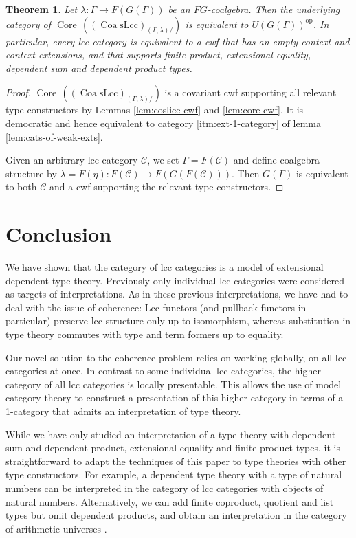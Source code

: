 \documentclass[a4paper]{article}
\newtheorem{theorem}{Theorem}
\theoremstyle{remark}
\theoremstyle{definition}
\begin{document}
\begin{theorem}
  \label{th:context-as-model}
  Let $\lambda : \Gamma \rightarrow F(G(\Gamma))$ be an $FG$-coalgebra.
  Then the underlying category of $\operatorname{Core} \, ((\operatorname{Coa} \mathrm{sLcc})_{(\Gamma, \lambda) /})$ is equivalent to $U(G(\Gamma))^\mathrm{op}$.
  In particular, every lcc category is equivalent to a cwf that has an empty context and context extensions, and that supports finite product, extensional equality, dependent sum and dependent product types.
\end{theorem}
\begin{proof}
  $\operatorname{Core} \, ((\operatorname{Coa} \mathrm{sLcc})_{(\Gamma, \lambda) /})$ is a covariant cwf supporting all relevant type constructors by Lemmas \ref{lem:coslice-cwf} and \ref{lem:core-cwf}.
  It is democratic and hence equivalent to category \ref{itm:ext-1-category} of lemma \ref{lem:cats-of-weak-exts}.

  Given an arbitrary lcc category $\mathcal{C}$, we set $\Gamma = F(\mathcal{C})$ and define coalgebra structure by $\lambda = F(\eta) : F(\mathcal{C}) \rightarrow F(G(F(\mathcal{C})))$.
  Then $G(\Gamma)$ is equivalent to both $\mathcal{C}$ and a cwf supporting the relevant type constructors.
\end{proof}

\section{Conclusion}

We have shown that the category of lcc categories is a model of extensional dependent type theory.
Previously only individual lcc categories were considered as targets of interpretations.
As in these previous interpretations, we have had to deal with the issue of coherence:
Lcc functors (and pullback functors in particular) preserve lcc structure only up to isomorphism, whereas substitution in type theory commutes with type and term formers up to equality.

Our novel solution to the coherence problem relies on working globally, on all lcc categories at once.
In contrast to some individual lcc categories, the higher category of all lcc categories is locally presentable.
This allows the use of model category theory to construct a presentation of this higher category in terms of a 1-category that admits an interpretation of type theory.

While we have only studied an interpretation of a type theory with dependent sum and dependent product, extensional equality and finite product types, it is straightforward to adapt the techniques of this paper to type theories with other type constructors.
For example, a dependent type theory with a type of natural numbers can be interpreted in the category of lcc categories with objects of natural numbers.
Alternatively, we can add finite coproduct, quotient and list types but omit dependent products, and obtain an interpretation in the category of arithmetic universes \citep{au-as-list-arithmetic-pretopos,au-sketches}.
\end{document}
